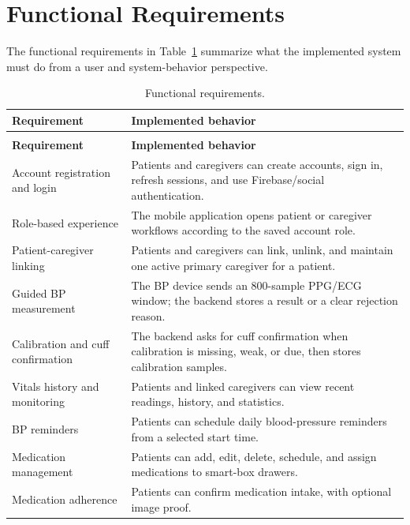 \documentclass[12pt,a4paper]{report}
\begin{document}
\clearpage
\section{Functional Requirements}

The functional requirements in Table~\ref{tab:functional-reqs} summarize what
the implemented system must do from a user and system-behavior perspective.

\begingroup
\small
\setlength{\LTpre}{0.3em}
\setlength{\LTpost}{0.3em}
\begin{longtable}{@{}>{\raggedright\arraybackslash}p{4.4cm}>{\raggedright\arraybackslash}p{10.0cm}@{}}
\caption{Functional requirements.}\label{tab:functional-reqs}\\
\toprule
\textbf{Requirement} & \textbf{Implemented behavior} \\
\midrule
\endfirsthead
\multicolumn{2}{c}{\small\itshape Table~\ref{tab:functional-reqs} continued}\\
\toprule
\textbf{Requirement} & \textbf{Implemented behavior} \\
\midrule
\endhead
\bottomrule
\endfoot
Account registration and login & Patients and caregivers can create accounts, sign in, refresh sessions, and use Firebase/social authentication. \\
Role-based experience & The mobile application opens patient or caregiver workflows according to the saved account role. \\
Patient-caregiver linking & Patients and caregivers can link, unlink, and maintain one active primary caregiver for a patient. \\
Guided BP measurement & The BP device sends an 800-sample PPG/ECG window; the backend stores a result or a clear rejection reason. \\
Calibration and cuff confirmation & The backend asks for cuff confirmation when calibration is missing, weak, or due, then stores calibration samples. \\
Vitals history and monitoring & Patients and linked caregivers can view recent readings, history, and statistics. \\
BP reminders & Patients can schedule daily blood-pressure reminders from a selected start time. \\
Medication management & Patients can add, edit, delete, schedule, and assign medications to smart-box drawers. \\
Medication adherence & Patients can confirm medication intake, with optional image proof. \\

\end{longtable}
\end{document}
